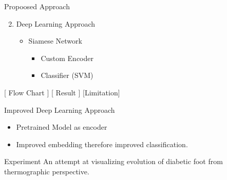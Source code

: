 \documentclass[
  ignorenonframetext,
]{beamer}
\providecommand{\tightlist}{%
  \setlength{\itemsep}{0pt}\setlength{\parskip}{0pt}}\usepackage{longtable,booktabs,array}
\begin{document}
\begin{frame}{Propoosed Approach}
\label{propoosed-approach}
\begin{enumerate}
\setcounter{enumi}{1}
\item
  Deep Learning Approach

  \begin{itemize}
  \tightlist
  \item
    Siamese Network

    \begin{itemize}
    \tightlist
    \item
      Custom Encoder
    \item
      Classifier (SVM)
    \end{itemize}
  \end{itemize}
\end{enumerate}

{[} Flow Chart {]} {[} Result {]} {[}Limitation{]}
\end{frame}

\begin{frame}{Improved Deep Learning Approach}
\label{improved-deep-learning-approach}
\begin{itemize}
\item
  Pretrained Model as encoder
\item
  Improved embedding therefore improved classification.
\end{itemize}
\end{frame}

\begin{frame}{Experiment}
\label{experiment}
An attempt at visualizing evolution of diabetic foot from thermographic
perspective.
\end{frame}
\end{document}
